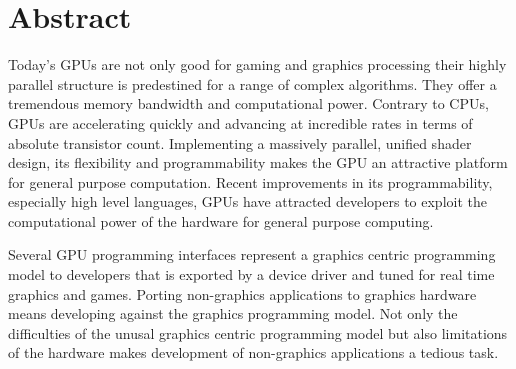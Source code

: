 \begingroup
\let\clearpage\relax
\let\cleardoublepage\relax
\let\cleardoublepage\relax
{}
\section*{Abstract}
Today's GPUs are not only good for gaming and graphics processing their highly parallel structure is predestined for a range of complex algorithms. They offer a tremendous memory bandwidth and computational power. Contrary to CPUs, GPUs are accelerating quickly and advancing at incredible rates in terms of absolute transistor count. Implementing a massively parallel, unified shader design, its flexibility and programmability makes the GPU an attractive platform for general purpose computation. Recent improvements in its programmability, especially high level languages, GPUs have attracted developers to exploit the computational power of the hardware for general purpose computing. 

Several GPU programming interfaces represent a graphics centric programming
model to developers that is exported by a device driver and tuned for real 
time graphics and games. Porting non-graphics applications to graphics hardware 
means developing against the graphics programming model. Not only the 
difficulties of the unusal graphics centric programming model but also
limitations of the hardware makes development of non-graphics applications a tedious
task. 

